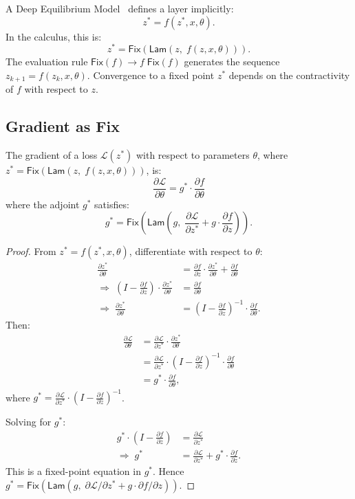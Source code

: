 \documentclass{lmcs}
\theoremstyle{plain}
\theoremstyle{definition}
\newcommand{\app}[2]{#1\;#2}
\newcommand{\fix}{\mathsf{Fix}}
\begin{document}
A Deep Equilibrium Model~\cite{bai2019} defines a layer implicitly:
\[
z^* = f(z^*, x, \theta).
\]
In the calculus, this is:
\[
z^* = \fix(\mathsf{Lam}(z,\; f(z, x, \theta))).
\]
The evaluation rule $\fix(f) \to \app{f}{\fix(f)}$ generates the sequence
$z_{k+1} = f(z_k, x, \theta)$. Convergence to a fixed point $z^*$ depends on
the contractivity of $f$ with respect to $z$.

\subsection{Gradient as Fix}

\begin{thm}\label{thm:deq-grad}
The gradient of a loss $\mathcal{L}(z^*)$ with respect to parameters
$\theta$, where $z^* = \fix(\mathsf{Lam}(z,\; f(z, x, \theta)))$, is:
\[
\frac{\partial \mathcal{L}}{\partial \theta}
  = g^* \cdot \frac{\partial f}{\partial \theta}
\]
where the adjoint $g^*$ satisfies:
\[
g^* = \fix\!\left(\mathsf{Lam}\!\left(g,\;
  \frac{\partial \mathcal{L}}{\partial z^*} +
  g \cdot \frac{\partial f}{\partial z}\right)\right).
\]
\end{thm}

\begin{proof}
From $z^* = f(z^*, x, \theta)$, differentiate with respect to $\theta$:
\begin{align*}
\frac{\partial z^*}{\partial \theta}
  &= \frac{\partial f}{\partial z} \cdot \frac{\partial z^*}{\partial \theta}
   + \frac{\partial f}{\partial \theta} \\[4pt]
\Rightarrow\;
(I - \frac{\partial f}{\partial z}) \cdot \frac{\partial z^*}{\partial \theta}
  &= \frac{\partial f}{\partial \theta} \\[4pt]
\Rightarrow\;
\frac{\partial z^*}{\partial \theta}
  &= (I - \frac{\partial f}{\partial z})^{-1} \cdot
     \frac{\partial f}{\partial \theta}.
\end{align*}
Then:
\begin{align*}
\frac{\partial \mathcal{L}}{\partial \theta}
  &= \frac{\partial \mathcal{L}}{\partial z^*} \cdot
     \frac{\partial z^*}{\partial \theta} \\
  &= \frac{\partial \mathcal{L}}{\partial z^*} \cdot
     (I - \frac{\partial f}{\partial z})^{-1} \cdot
     \frac{\partial f}{\partial \theta} \\
  &= g^* \cdot \frac{\partial f}{\partial \theta},
\end{align*}
where $g^* = \frac{\partial \mathcal{L}}{\partial z^*} \cdot
(I - \frac{\partial f}{\partial z})^{-1}$.

Solving for $g^*$:
\begin{align*}
g^* \cdot (I - \frac{\partial f}{\partial z})
  &= \frac{\partial \mathcal{L}}{\partial z^*} \\
\Rightarrow\;
g^* &= \frac{\partial \mathcal{L}}{\partial z^*} +
      g^* \cdot \frac{\partial f}{\partial z}.
\end{align*}
This is a fixed-point equation in $g^*$. Hence
$g^* = \fix(\mathsf{Lam}(g,\;
\partial \mathcal{L}/\partial z^* + g \cdot \partial f/\partial z))$.
\end{proof}
\end{document}
